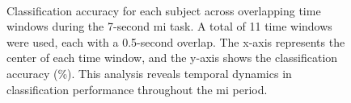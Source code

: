 \setlength{}
\setlength{}
\begin{figure}[ht!]
  \centering
  \\
  \hfill
  \caption{Classification accuracy for each subject across overlapping time windows during the 7-second \gls{mi} task. A total of 11 time windows were used, each with a 0.5-second overlap. The x-axis represents the center of each time window, and the y-axis shows the classification accuracy (\%). This analysis reveals temporal dynamics in classification performance throughout the \gls{mi} period.}
  \label{fig:accuracy_all_subjects}
\end{figure}


